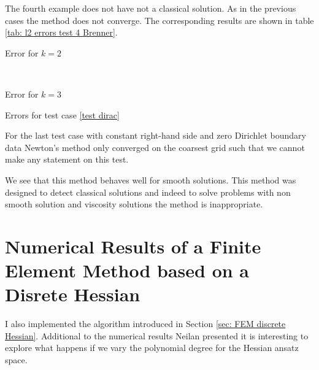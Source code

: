 The fourth example does not have not a classical solution. As in the previous cases the method does not converge. The corresponding results are shown in table \ref{tab: l2 errors test 4 Brenner}.

\begin{table}[h]
	\begin{subtable}[b]{0.45\textwidth}
		\centering
		\pgfplotstabletypeset[columns={iterations, l2error, h1error,N},
				    every row 0 column 0/.style={set content=init},
				    columns/l2error/.style={ /pgf/number format/sci precision=6}     %
		]\MAFourBrennerTwo
    	\caption{Error for $k=2$}
   \end{subtable}
   ~
	\begin{subtable}[b]{0.45\textwidth}
		\centering
		\pgfplotstabletypeset[columns={iterations, l2error, h1error,N},
				    every row 0 column 0/.style={set content=init},
				    columns/l2error/.style={ /pgf/number format/sci precision=6}     %
		]\MAFourBrennerThree
 	\caption{Error for $k=3$}
	\end{subtable}
	\caption{Errors for test case \ref{test dirac}}
	\label{tab: l2 errors test 4 Brenner}
\end{table}

For the last test case with constant right-hand side and zero Dirichlet boundary data Newton's method only converged on the coarsest grid such that we cannot make any statement on this test.

We see that this method behaves well for smooth solutions. This method was designed to detect classical solutions and indeed to solve problems with non smooth solution and viscosity solutions the method is inappropriate.

\newpage
\section{Numerical Results of a Finite Element Method based on a Disrete Hessian}

I also implemented the algorithm introduced in Section \ref{sec: FEM discrete Hessian}.
Additional to the numerical results Neilan presented it is interesting to explore what happens if we vary the polynomial degree for the Hessian ansatz space. 

